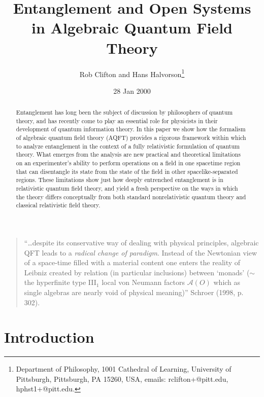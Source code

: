 \documentclass[12pt]{article}
\date{28 Jan 2000}
\title{Entanglement and Open Systems in Algebraic Quantum Field Theory}
\author{Rob Clifton and Hans Halvorson\footnote{Department of Philosophy,
 1001 Cathedral of
Learning, University of
Pittsburgh, Pittsburgh, PA 15260, USA, emails: rclifton+@pitt.edu, 
hphst1+@pitt.edu.}}
\newcommand{\alg}[1]{\mbox{$\mathcal{#1}$}}
\begin{document}
\maketitle 
\begin{abstract}
Entanglement has long been the subject of discussion by philosophers 
of quantum theory, and has recently come to play an essential role 
for physicists in their development of quantum information theory.  
In this paper we show how the formalism of algebraic quantum 
field theory (AQFT) provides a rigorous framework within which to 
analyze entanglement in the context of a fully relativistic formulation 
of quantum theory.  What emerges from the analysis 
are new practical and theoretical limitations on an 
experimenter's ability to perform operations on a field in one spacetime region 
that can disentangle its state from the state of the field in other 
spacelike-separated regions.  These limitations show just how deeply 
entrenched entanglement is in relativistic quantum field theory, and yield a 
fresh perspective on the ways in which the theory differs conceptually 
from both standard
nonrelativistic quantum theory and classical relativistic field 
theory.         
  \end{abstract} 

\newpage

  \begin{quote}
``\ldots despite its conservative way of dealing with physical 
principles, algebraic QFT leads to a \emph{radical change of 
paradigm}.  Instead of the Newtonian view of a space-time filled with 
a material content one enters the reality of Leibniz created by 
relation (in particular inclusions) between `monads' ($\sim$ the 
hyperfinite type III$_{1}$ local von Neumann factors $\alg{A}(O)$ which 
as single algebras are nearly void of physical meaning)'' Schroer  
(1998, p. 302).
\end{quote}
   
\section{Introduction}
 
\end{document}
